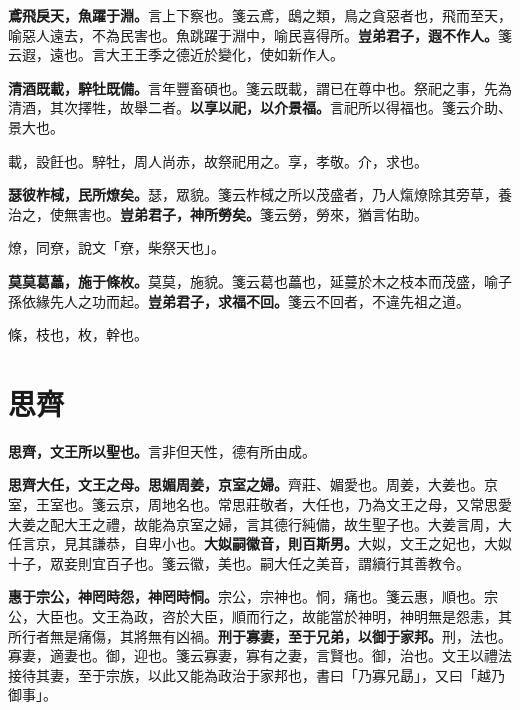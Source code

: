 \textbf{鳶飛戾天，魚躍于淵。}{\footnotesize 言上下察也。箋云鳶，鴟之類，鳥之貪惡者也，飛而至天，喻惡人遠去，不為民害也。魚跳躍于淵中，喻民喜得所。}\textbf{豈弟君子，遐不作人。}{\footnotesize 箋云遐，遠也。言大王王季之德近於變化，使如新作人。}

\textbf{清酒既載，騂牡既備。}{\footnotesize 言年豐畜碩也。箋云既載，謂已在尊中也。祭祀之事，先為清酒，其次擇牲，故舉二者。}\textbf{以享以祀，以介景福。}{\footnotesize 言祀所以得福也。箋云介助、景大也。}

\begin{quoting}載，設飪也。騂牡，周人尚赤，故祭祀用之。享，孝敬。介，求也。\end{quoting}

\textbf{瑟彼柞棫，民所燎矣。}{\footnotesize 瑟，眾貌。箋云柞棫之所以茂盛者，乃人熂燎除其旁草，養治之，使無害也。}\textbf{豈弟君子，神所勞矣。}{\footnotesize 箋云勞，勞來，猶言佑助。}

\begin{quoting}燎，同尞，說文「尞，柴祭天也」。\end{quoting}

\textbf{莫莫葛藟，施于條枚。}{\footnotesize 莫莫，施貌。箋云葛也藟也，延蔓於木之枝本而茂盛，喻子孫依緣先人之功而起。}\textbf{豈弟君子，求福不回。}{\footnotesize 箋云不回者，不違先祖之道。}

\begin{quoting}條，枝也，枚，幹也。\end{quoting}

\section{思齊}


\textbf{思齊，文王所以聖也。}{\footnotesize 言非但天性，德有所由成。}

\textbf{思齊大任，文王之母。思媚周姜，京室之婦。}{\footnotesize 齊莊、媚愛也。周姜，大姜也。京室，王室也。箋云京，周地名也。常思莊敬者，大任也，乃為文王之母，又常思愛大姜之配大王之禮，故能為京室之婦，言其德行純備，故生聖子也。大姜言周，大任言京，見其謙恭，自卑小也。}\textbf{大姒嗣徽音，則百斯男。}{\footnotesize 大姒，文王之妃也，大姒十子，眾妾則宜百子也。箋云徽，美也。嗣大任之美音，謂續行其善教令。}

\textbf{惠于宗公，神罔時怨，神罔時恫。}{\footnotesize 宗公，宗神也。恫，痛也。箋云惠，順也。宗公，大臣也。文王為政，咨於大臣，順而行之，故能當於神明，神明無是怨恚，其所行者無是痛傷，其將無有凶禍。}\textbf{刑于寡妻，至于兄弟，以御于家邦。}{\footnotesize 刑，法也。寡妻，適妻也。御，迎也。箋云寡妻，寡有之妻，言賢也。御，治也。文王以禮法接待其妻，至于宗族，以此又能為政治于家邦也，書曰「乃寡兄勗」，又曰「越乃御事」。}

